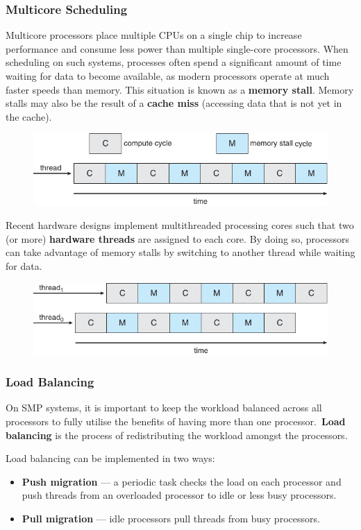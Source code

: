 \documentclass{article}
\begin{document}
\subsubsection{Multicore Scheduling}
Multicore processors place multiple CPUs on a single chip to increase
performance and consume less power than multiple single-core
processors. When scheduling on such systems, processes often spend a
significant amount of time waiting for data to become available, as
modern processors operate at much faster speeds than memory. This
situation is known as a \textbf{memory stall}. Memory stalls may also
be the result of a \textbf{cache miss} (accessing data that is not yet
in the cache).
\begin{figure}[H]
    \centering
    \includegraphics[width = 0.8\linewidth]{figures/memory_stall.pdf}
\end{figure}
Recent hardware designs implement multithreaded processing cores such
that two (or more) \textbf{hardware threads} are assigned to each core.
By doing so, processors can take advantage of memory stalls by switching
to another thread while waiting for data.
\begin{figure}[H]
    \centering
    \includegraphics[width = 0.8\linewidth]{figures/memory_stall_2.pdf}
\end{figure}
\subsubsection{Load Balancing}
On SMP systems, it is important to keep the workload balanced across
all processors to fully utilise the benefits of having more than one
processor.\ \textbf{Load balancing} is the process of redistributing
the workload amongst the processors.

Load balancing can be implemented in two ways:
\begin{itemize}
    \item \textbf{Push migration} --- a periodic task checks the load on
          each processor and push threads from an overloaded processor to
          idle or less busy processors.
    \item \textbf{Pull migration} --- idle processors pull threads from
          busy processors.
\end{itemize}
\end{document}
